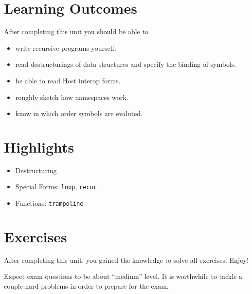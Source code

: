 \documentclass[11pt,a4paper]{article}
\begin{document}
\section{Learning Outcomes}

After completing this unit you should be able to

\begin{itemize}
    \item write recursive programs yourself.
    \item read destructurings of data structures and specify the binding of symbols.
    \item be able to read Host interop forms.
    \item roughly sketch how namespaces work.
    \item know in which order symbols are evaluted.
\end{itemize}

\section{Highlights}

\begin{itemize}
    \item Destructuring
    \item Special Forms: \verb|loop|, \verb|recur|
    \item Functions: \verb|trampoline|
\end{itemize}



\section{Exercises}

\begin{exercise}
    After completing this unit, you gained the knowledge to solve all exercises. Enjoy!

    Expect exam questions to be about ``medium'' level.
    It is worthwhile to tackle a couple hard problems 
    in order to prepare for the exam.
\end{exercise}
\end{document}
